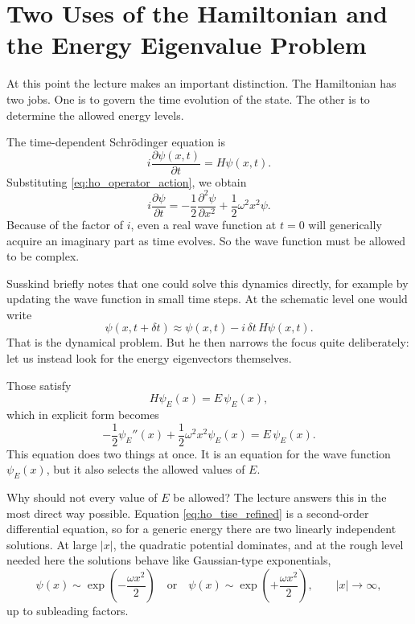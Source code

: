 \section{Two Uses of the Hamiltonian and the Energy Eigenvalue Problem}

At this point the lecture makes an important distinction. The Hamiltonian has two jobs. One is to govern the time evolution of the state. The other is to determine the allowed energy levels.

The time-dependent Schr\"odinger equation is
\begin{equation}
i\frac{\partial \psi(x,t)}{\partial t}=H\psi(x,t).
\label{eq:ho_tdse}
\end{equation}
Substituting \eqref{eq:ho_operator_action}, we obtain
\begin{equation}
i\frac{\partial \psi}{\partial t}
=
-\frac{1}{2}\frac{\partial^{2}\psi}{\partial x^{2}}
+\frac{1}{2}\omega^{2}x^{2}\psi.
\end{equation}
Because of the factor of \(i\), even a real wave function at \(t=0\) will generically acquire an imaginary part as time evolves. So the wave function must be allowed to be complex.

Susskind briefly notes that one could solve this dynamics directly, for example by updating the wave function in small time steps. At the schematic level one would write
\begin{equation}
\psi(x,t+\delta t)\approx \psi(x,t)-i\,\delta t\,H\psi(x,t).
\end{equation}
That is the dynamical problem. But he then narrows the focus quite deliberately: let us instead look for the energy eigenvectors themselves.

Those satisfy
\begin{equation}
H\psi_{E}(x)=E\,\psi_{E}(x),
\end{equation}
which in explicit form becomes
\begin{equation}
-\frac{1}{2}\psi_{E}''(x)+\frac{1}{2}\omega^{2}x^{2}\psi_{E}(x)=E\,\psi_{E}(x).
\label{eq:ho_tise_refined}
\end{equation}
This equation does two things at once. It is an equation for the wave function \(\psi_{E}(x)\), but it also selects the allowed values of \(E\).

Why should not every value of \(E\) be allowed? The lecture answers this in the most direct way possible. Equation \eqref{eq:ho_tise_refined} is a second-order differential equation, so for a generic energy there are two linearly independent solutions. At large \(|x|\), the quadratic potential dominates, and at the rough level needed here the solutions behave like Gaussian-type exponentials,
\begin{equation}
\psi(x)\sim \exp\!\left(-\frac{\omega x^{2}}{2}\right)
\quad \text{or} \quad
\psi(x)\sim \exp\!\left(+\frac{\omega x^{2}}{2}\right),
\qquad |x|\to\infty,
\end{equation}
up to subleading factors.

